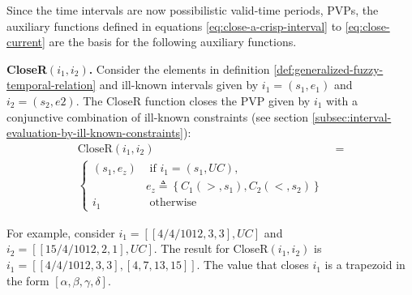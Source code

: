 Since the time intervals are now possibilistic valid-time periods, PVPs, the auxiliary functions defined in equations \eqref{eq:close-a-crisp-interval} to \eqref{eq:close-current} are the basis for the following auxiliary functions.

\begin{definition}
\label{def:close-r-a-pvp}
\textbf{CloseR$\left(i_1, i_2\right)$.}
Consider the elements in definition \ref{def:generalized-fuzzy-temporal-relation} and ill-known intervals given by $i_1=(s_1,e_1)$ and $i_2=(s_2,e2)$. The CloseR function closes the PVP given by $i_1$ with a conjunctive combination of ill-known constraints (see section \ref{subsec:interval-evaluation-by-ill-known-constraints}):
\begin{align}
\label{eq:close-r-a-pvp}
\text{CloseR}\left(i_1, i_2\right) &= \\
\begin{cases}
\nonumber
\left(s_1, e_z \right) & \mbox{ if } i_1 = (s_1, UC), \\
& e_z \triangleq \left \lbrace C_1\left(>, s_1 \right), C_2\left(<, s_2 \right) \right \rbrace \\
i_1 & \mbox{ otherwise }
\end{cases}
\end{align}
\end{definition}

For example, consider $i_1 = \left[\left[4/4/1012, 3, 3\right] , UC\right]$ and $i_2 = \left[ \left[15/4/1012,2,1\right], UC\right]$. The result for CloseR$\left(i_1, i_2\right)$  is $i_1 = \left[ \left[4/4/1012, 3, 3\right], \left[4,7,13,15 \right] \right]$. The value that closes $i_1$ is a trapezoid in the form $\left[ \alpha, \beta, \gamma, \delta \right]$.

